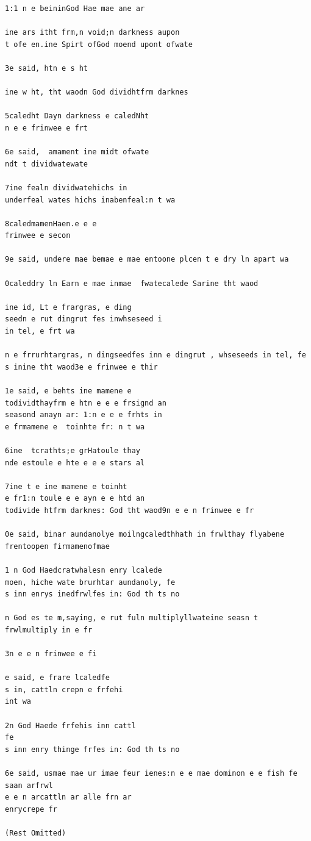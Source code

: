 \documentclass[11pt]{article}
\begin{document}
\begin{lstlisting}
1:1 n e beininGod Hae mae ane ar

ine ars itht frm,n void;n darkness aupon
t ofe en.ine Spirt ofGod moend upont ofwate

3e said, htn e s ht

ine w ht, tht waodn God dividhtfrm darknes

5caledht Dayn darkness e caledNht
n e e frinwee e frt 

6e said,  amament ine midt ofwate
ndt t dividwatewate

7ine fealn dividwatehichs in
underfeal wates hichs inabenfeal:n t wa

8caledmamenHaen.e e e 
frinwee e secon

9e said, undere mae bemae e mae entoone plcen t e dry ln apart wa

0caleddry ln Earn e mae inmae  fwatecalede Sarine tht waod

ine id, Lt e frargras, e ding
seedn e rut dingrut fes inwhseseed i
in tel, e frt wa

n e frrurhtargras, n dingseedfes inn e dingrut , whseseeds in tel, fe
s inine tht waod3e e frinwee e thir

1e said, e behts ine mamene e 
todividthayfrm e htn e e e frsignd an
seasond anayn ar: 1:n e e e frhts in
e frmamene e  toinhte fr: n t wa

6ine  tcrathts;e grHatoule thay
nde estoule e hte e e e stars al

7ine t e ine mamene e toinht
e fr1:n toule e e ayn e e htd an
todivide htfrm darknes: God tht waod9n e e n frinwee e fr

0e said, binar aundanolye moilngcaledthhath in frwlthay flyabene frentoopen firmamenofmae 

1 n God Haedcratwhalesn enry lcalede 
moen, hiche wate brurhtar aundanoly, fe
s inn enrys inedfrwlfes in: God th ts no

n God es te m,saying, e rut fuln multiplyllwateine seasn t frwlmultiply in e fr

3n e e n frinwee e fi

e said, e frare lcaledfe
s in, cattln crepn e frfehi
int wa

2n God Haede frfehis inn cattl
fe
s inn enry thinge frfes in: God th ts no

6e said, usmae mae ur imae feur ienes:n e e mae dominon e e fish fe saan arfrwl
e e n arcattln ar alle frn ar
enrycrepe fr

(Rest Omitted)

\end{lstlisting}
\end{document}
